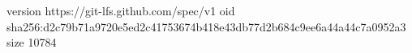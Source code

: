 version https://git-lfs.github.com/spec/v1
oid sha256:d2c79b71a9720e5ed2c41753674b418e43db77d2b684c9ee6a44a44c7a0952a3
size 10784

